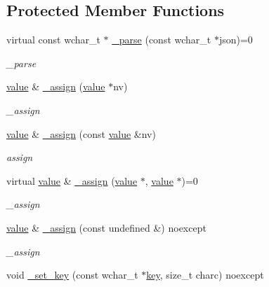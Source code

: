 \subsection*{Protected Member Functions}
\begin{DoxyCompactItemize}
\item 
virtual const wchar\+\_\+t $\ast$ \hyperlink{classformat_1_1value_a7859b1aa48f667a83e091f0eba22d4a1}{\+\_\+parse} (const wchar\+\_\+t $\ast$json)=0
\begin{DoxyCompactList}\small\item\em \+\_\+parse \end{DoxyCompactList}\item 
\hyperlink{classformat_1_1value}{value} \& \hyperlink{classformat_1_1value_ab791aabbee3a4a415a62910c150b0a82}{\+\_\+assign} (\hyperlink{classformat_1_1value}{value} $\ast$nv)
\begin{DoxyCompactList}\small\item\em \+\_\+assign \end{DoxyCompactList}\item 
\hyperlink{classformat_1_1value}{value} \& \hyperlink{classformat_1_1value_a0e07a062f2925491a1a148cc77ae2e86}{\+\_\+assign} (const \hyperlink{classformat_1_1value}{value} \&nv)
\begin{DoxyCompactList}\small\item\em assign \end{DoxyCompactList}\item 
virtual \hyperlink{classformat_1_1value}{value} \& \hyperlink{classformat_1_1value_a2432012e597ef7a5c853c184c77f8310}{\+\_\+assign} (\hyperlink{classformat_1_1value}{value} $\ast$, \hyperlink{classformat_1_1value}{value} $\ast$)=0
\begin{DoxyCompactList}\small\item\em \+\_\+assign \end{DoxyCompactList}\item 
\hyperlink{classformat_1_1value}{value} \& \hyperlink{classformat_1_1value_adf5e3905bcb7b8616981831de01e3555}{\+\_\+assign} (const undefined \&) noexcept
\begin{DoxyCompactList}\small\item\em \+\_\+assign \end{DoxyCompactList}\item 
void \hyperlink{classformat_1_1value_a473256bcee74e255df322920d250aac0}{\+\_\+set\+\_\+key} (const wchar\+\_\+t $\ast$\hyperlink{classformat_1_1value_ad4865e7984fc9f3b5ce7c17fd7ac740c}{key}, size\+\_\+t charc) noexcept

\end{DoxyCompactItemize}
